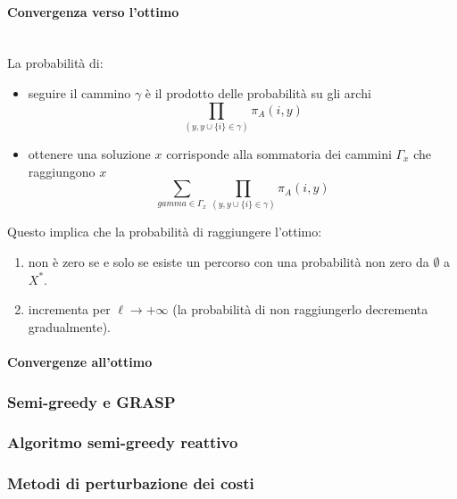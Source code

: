 \documentclass{article}
\begin{document}
\paragraph{Convergenza verso l'ottimo}\mbox{}\\
La probabilità di:
\begin{itemize}
    \item seguire il cammino $\gamma$ è il prodotto delle probabilità su gli archi
    $$\prod_{(y,y\cup\{i\}\in\gamma)}\pi_A(i,y)$$
    \item ottenere una soluzione $x$ corrisponde alla sommatoria dei cammini $\Gamma_x$ che raggiungono
    $x$
    $$\sum_{gamma\in\Gamma_x}\prod_{(y,y\cup\{i\}\in\gamma)}\pi_A(i,y)$$
\end{itemize}
Questo implica che la probabilità di raggiungere l'ottimo:
\begin{enumerate}
    \item non è zero se e solo se esiste un percorso con una probabilità non zero da $\emptyset$ a $X^*$.
    \item incrementa per $\ell\rightarrow +\infty$ (la probabilità di non raggiungerlo decrementa
    gradualmente).
\end{enumerate}
\paragraph{Convergenze all'ottimo}

\subsubsection{Semi-greedy e GRASP}
\subsubsection{Algoritmo semi-greedy reattivo}
\subsubsection{Metodi di perturbazione dei costi}
\end{document}
